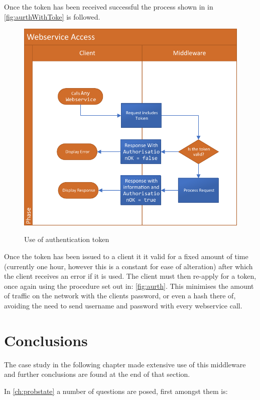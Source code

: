 Once the token has been received successful the process shown in in \autoref{fig:aurthWithToke} is followed.

 \begin{figure}[!htbp]
\myfloatalign
{\includegraphics[width=\linewidth]{gfx/MiddlewareAurthenticationWithToken}} 
\caption{Use of authentication token}
\label{fig:aurthWithToke}
\end{figure}

Once the token has been issued to a client it it valid for a fixed amount of time (currently one hour, however this is a constant for ease of alteration) after which the client receives an error if it is used. The client must then re-apply for a token, once again using the procedure set out in: \autoref{fig:aurth}. This minimises the amount of traffic on the network with the clients password, or even a hash there of, avoiding the need to send username and password with every webservice call. 

\section{Conclusions}

The case study in the following chapter made extensive use of this middleware and further conclusions are found at the end of that section.

In \autoref{ch:probstate} a number of questions are posed, first amongst them is:

